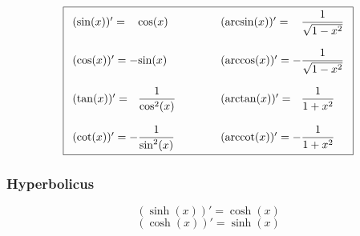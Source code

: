\[ \boxed{ \begin{array}{ l @{}l @{\quad\quad\quad}l @{}l }
(\sin(x))' =   &\cos(x)             & \quad (\arcsin(x))' =   & \dfrac{1}{\sqrt{1 - x^2}} \\\\
(\cos(x))' = - &\sin(x)             & \quad (\arccos(x))' = - & \dfrac{1}{\sqrt{1 - x^2}} \\\\
(\tan(x))' =   &\dfrac{1}{\cos^2(x)} & \quad (\arctan(x))' =   & \dfrac{1}{1 + x^2} \\\\
(\cot(x))' = - &\dfrac{1}{\sin^2(x)} & \quad (\arccot(x))' = - & \dfrac{1}{1 + x^2} 
\end{array}} \]

\subsubsection{Hyperbolicus}
\[ \boxed{(\sinh(x))' = \cosh(x)} \]
\[ \boxed{(\cosh(x))' = \sinh(x)} \]
